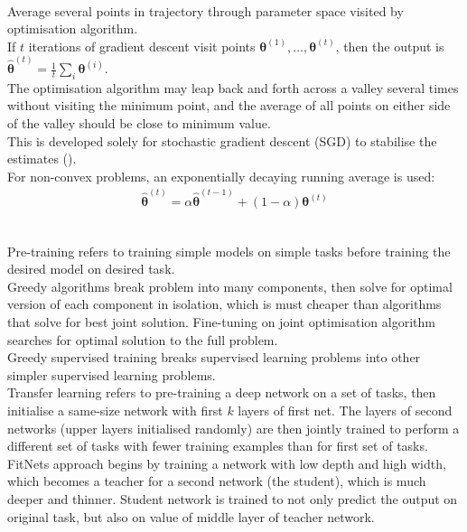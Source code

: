 \begin{remark} \\
Average several points in trajectory through parameter space visited by optimisation algorithm.\\
If $t$ iterations of gradient descent visit points $\bm{\theta}^{(1)}, \ldots, \bm{\theta}^{(t)}$, then the output is $\hat{\bm{\theta}}^{(t)} = \frac{1}{t} \sum_i \bm{\theta}^{(i)}$.\\
The optimisation algorithm may leap back and forth across a valley several times without visiting the minimum point, and the average of all points on either side of the valley should be close to minimum value.\\
This is developed solely for stochastic gradient descent (SGD) to stabilise the estimates (\cite{granziol2020gadam}).\\
For non-convex problems, an exponentially decaying running average is used:
\begin{align}
\hat{\bm{\theta}}^{(t)} = \alpha \hat{\bm{\theta}}^{(t-1)} + (1- \alpha)\bm{\theta}^{(t)} \nonumber
\end{align}
\end{remark}

\begin{remark} \\
Pre-training refers to training simple models on simple tasks before training the desired model on desired task.\\
Greedy algorithms break problem into many components, then solve for optimal version of each component in isolation, which is must cheaper than algorithms that solve for best joint solution. Fine-tuning on joint optimisation algorithm searches for optimal solution to the full problem.\\
Greedy supervised training breaks supervised learning problems into other simpler supervised learning problems.\\
Transfer learning refers to pre-training a deep network on a set of tasks, then initialise a same-size network with first $k$ layers of first net. The layers of second networks (upper layers initialised randomly) are then jointly trained to perform a different set of tasks with fewer training examples than for first set of tasks.\\
FitNets approach begins by training a network with low depth and high width, which becomes a teacher for a second network (the student), which is much deeper and thinner. Student network is trained to not only predict the output on original task, but also on value of middle layer of teacher network.
\end{remark}

